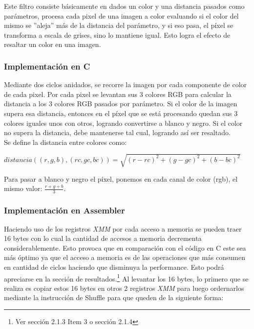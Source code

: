 Este filtro consiste b\'asicamente en dados un color y una distancia pasados como par\'ametros, procesa cada pixel de una imagen a color evaluando si el color del mismo se ''aleja'' m\'as de la distancia del par\'ametro, y si eso pasa, el p\'ixel se transforma a escala de grises, sino lo mantiene igual. Esto logra el efecto de resaltar un color en una imagen.

\subsubsection{Implementación en C}
Mediante dos ciclos anidados, se recorre la imagen por cada componente de color de cada pixel. Por cada pixel se levantan sus 3 colores RGB para calcular la distancia a los 3 colores RGB pasados por par\'ametro. Si el color de la imagen supera esa distancia, entonces en el p\'ixel que se est\'a procesando quedan sus 3 colores iguales unos con otros, logrando convertirse a blanco y negro. Si el color no supera la distancia, debe mantenerse tal cual, logrando as\'i ser resaltado.\\
Se define la distancia entre colores como:\\

\begin{center}
$distancia((r, g, b), (rc, gc, bc)) = \sqrt{(r - rc)^2 + (g - gc)^2 + (b - bc)^2}$
\end{center}

Para pasar a blanco y negro el p\'ixel, ponemos en cada canal de color (rgb), el mismo valor: $\frac{r + g + b}{3}$.

\subsubsection{Implementación en Assembler}
Haciendo uso de los registros \emph{XMM} por cada acceso a memoria se pueden traer 16 bytes con lo cual la cantidad de accesos a memoria decrementa 
considerablemente. Esto provoca que en comparaci\'on con el c\'odigo en C este sea m\'as \'optimo ya que el acceso a memoria es de las operaciones que m\'as 
consumen en cantidad de ciclos haciendo que disminuya la performance. Esto podr\'a apreciarse en la secci\'on de resultados.\footnote{Ver secci\'on 2.1.3 Item 3 o secci\'on 2.1.4}\newline
Al levantar los 16 bytes, lo primero que se realiza es copiar estos 16 bytes en otros 2 registros \emph{XMM} para luego ordernarlos mediante la instrucci\'on
de Shuffle para que queden de la siguiente forma:

